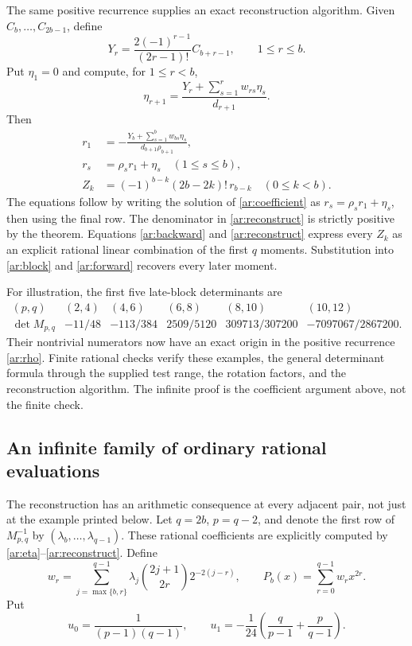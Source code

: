 \documentclass[11pt,a4paper]{article}
\numberwithin{equation}{section}
\theoremstyle{definition}
\theoremstyle{remark}
\begin{document}
The same positive recurrence supplies an exact reconstruction algorithm.
Given $C_b,\ldots,C_{2b-1}$, define
\[
            Y_r=\frac{2(-1)^{r-1}}{(2r-1)!}C_{b+r-1},
                       \qquad 1\le r\le b.
\]
Put $\eta_1=0$ and compute, for $1\le r<b$,
\begin{equation}\label{ar:eta}
       \eta_{r+1}=\frac{Y_r+\sum_{s=1}^rw_{rs}\eta_s}{d_{r+1}}.
\end{equation}
Then
\begin{equation}\label{ar:reconstruct}
 \begin{split}
 r_1&=-\frac{Y_b+\sum_{s=1}^bw_{bs}\eta_s}
                  {d_{b+1}\rho_{b+1}},\\
 r_s&=\rho_sr_1+\eta_s\quad(1\le s\le b),\\
 Z_k&=(-1)^{b-k}(2b-2k)!\,r_{b-k}\quad(0\le k<b).
 \end{split}
\end{equation}
The equations follow by writing the solution of
\eqref{ar:coefficient} as $r_s=\rho_sr_1+\eta_s$, then using
the final row. The denominator in \eqref{ar:reconstruct} is strictly
positive by the theorem. Equations \eqref{ar:backward} and
\eqref{ar:reconstruct} express every $Z_k$ as an explicit rational
linear combination of the first $q$ moments. Substitution into
\eqref{ar:block} and \eqref{ar:forward} recovers every later moment.

For illustration, the first five late-block determinants are
\[
 \begin{array}{c|ccccc}
 (p,q)&(2,4)&(4,6)&(6,8)&(8,10)&(10,12)\\\hline
 \det M_{p,q}&-11/48&-113/384&2509/5120&309713/307200&-7097067/2867200.
 \end{array}
\]
Their nontrivial numerators now have an exact origin in the positive
recurrence \eqref{ar:rho}. Finite rational checks verify these examples,
the general determinant formula through the supplied test range, the
rotation factors, and the reconstruction algorithm. The infinite proof
is the coefficient argument above, not the finite check.

\subsection{An infinite family of ordinary rational evaluations}

The reconstruction has an arithmetic consequence at every adjacent pair,
not just at the example printed below. Let $q=2b$, $p=q-2$, and denote
the first row of $M_{p,q}^{-1}$ by $(\lambda_b,\ldots,\lambda_{q-1})$.
These rational coefficients are explicitly computed by
\eqref{ar:eta}--\eqref{ar:reconstruct}. Define
\begin{equation}\label{ar:all-weights}
 w_r=\sum_{j=\max\{b,r\}}^{q-1}
     \lambda_j\binom{2j+1}{2r}2^{-2(j-r)},\qquad
 P_b(x)=\sum_{r=0}^{q-1}w_rx^{2r}.
\end{equation}
Put
\[
 u_0=\frac1{(p-1)(q-1)},\qquad
 u_1=-\frac1{24}\left(\frac q{p-1}+\frac p{q-1}\right).
\]
\end{document}
